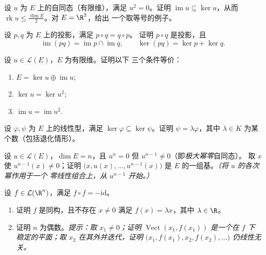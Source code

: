 \begin{exercise}[$\star\star$]\label{exo:b1:linmaps:5}
设 $u$ 为 $E$ 上的自同态（有限维），满足 $u^2 =
0$。证明 $\operatorname{im} u \subseteq \ker u$，从而
$\operatorname{rk} u \leq \frac{\dim E}{2}$。对 $E = \R^2$，给出
一个取等号的例子。
\end{exercise}

\begin{exercise}[$\star\star$]\label{exo:b1:linmaps:6}
设 $p, q$ 为 $E$ 上的投影，满足 $p \circ q = q \circ p$。
证明 $p \circ q$ 是投影，且
\[
\operatorname{im}(pq) = \operatorname{im} p \cap \operatorname{im}
q ,
\qquad
\ker (pq) = \ker p + \ker q .
\]
\end{exercise}

\begin{exercise}[$\star\star$]\label{exo:b1:linmaps:7}
设 $u \in \mathcal{L}(E)$，$E$ 为有限维。证明以下
三个条件等价：
\begin{enumerate}
  \item $E = \ker u \oplus \operatorname{im} u$;
  \item $\ker u = \ker u^2$;
  \item $\operatorname{im} u = \operatorname{im} u^2$.
\end{enumerate}
\end{exercise}

\begin{exercise}[$\star\star$]\label{exo:b1:linmaps:8}
设 $\varphi, \psi$ 为 $E$ 上的线性型，满足 $\ker\varphi
\subseteq \ker\psi$。证明 $\psi = \lambda\varphi$，其中
$\lambda \in K$ 为某个数（包括退化情形）。
\end{exercise}

\begin{exercise}[$\star\star\star$]\label{exo:b1:linmaps:9}
设 $u \in \mathcal{L}(E)$，$\dim E = n$，且 $u^n = 0$
但 $u^{n-1} \neq 0$（即\emph{极大幂零}自同态）。
取 $x$ 使 $u^{n-1}(x) \neq 0$；证明 $\bigl(x, u(x), \dots,
u^{n-1}(x)\bigr)$ 是 $E$ 的一组基。\emph{（将 $u$ 的各次幂作用于一个
零线性组合上，从 $u^{n-1}$ 开始。）}
\end{exercise}

\begin{exercise}[$\star\star\star$]\label{exo:b1:linmaps:10}
设 $f \in \mathcal{L}(\R^n)$，满足 $f \circ f = -\mathrm{id}$。
\begin{enumerate}
  \item 证明 $f$ 是同构，且不存在 $x \neq 0$
        满足 $f(x) = \lambda x$，其中 $\lambda \in \R$。
  \item 证明 $n$ 为偶数。\emph{提示：取 $x_1 \neq 0$；证明
        $\operatorname{Vect}(x_1, f(x_1))$ 是一个在
        $f$ 下稳定的平面；取 $x_2$ 在其外并迭代，证明
        $\bigl(x_1, f(x_1), x_2, f(x_2), \dots\bigr)$ 仍线性无关。}
\end{enumerate}
\end{exercise}

